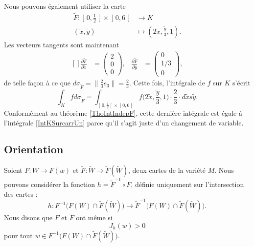 Nous pouvons également utiliser la carte
\begin{equation}
	\begin{aligned}
		\tilde F\colon \mathopen] 0 , \frac{ 1 }{2} \mathclose[\times\mathopen] 0 , 6 \mathclose[&\to K \\
		(\tilde x,\tilde y)&\mapsto (2\tilde x,\frac{ \tilde y }{ 3 },1). 
	\end{aligned}
\end{equation}
Les vecteurs tangents sont maintenant
\begin{equation}
	\begin{aligned}[]
		\frac{ \partial \tilde F }{ \partial \tilde x }&=\begin{pmatrix}
			2	\\ 
			0	\\ 
			0	
		\end{pmatrix},
		&\frac{ \partial \tilde F }{ \partial \tilde y }&=\begin{pmatrix}
			0	\\ 
			1/3	\\ 
			0	
		\end{pmatrix},
	\end{aligned}
\end{equation}
de telle façon à ce que $d\sigma_{\tilde F}=\| \frac{ 2 }{ 3 }e_3 \|=\frac{ 2 }{ 3 }$. Cette fois, l'intégrale de $f$ sur $K$ s'écrit
\begin{equation}
	\int_Kfd\sigma_{\tilde F}=\int_{\mathopen] 0 , \frac{ 1 }{2} \mathclose[\times\mathopen] 0 , 6 \mathclose[}f\big( 2\tilde x,\frac{ \tilde y }{ 3 },1 \big)\cdot\frac{ 2 }{ 3 }\cdot d\tilde xs\tilde y.
\end{equation}
Conformément au théorème \ref{ThoIntIndepF}, cette dernière intégrale est égale à l'intégrale \eqref{IntKSurcarrUn} parce qu'il s'agit juste d'un changement de variable.


\subsection{Orientation}


Soient $F\colon W\to F(w)$ et $\tilde F\colon \tilde W\to \tilde F(\tilde W)$, deux cartes de la variété $M$. Nous pouvons considérer la fonction $h=\tilde F^{-1}\circ F$, définie uniquement sur l'intersection des cartes :
\begin{equation}
	h\colon F^{-1}\big( F(W)\cap\tilde F(\tilde W) \big)\to \tilde F^{-1}\big( F(W)\cap\tilde F(\tilde W) \big).
\end{equation}
Nous disons que $F$ et $\tilde F$ ont même  si
\begin{equation}
	J_h(w)>0
\end{equation}
pour tout $w\in  F^{-1}\big( F(W)\cap\tilde F(\tilde W) \big)$.

